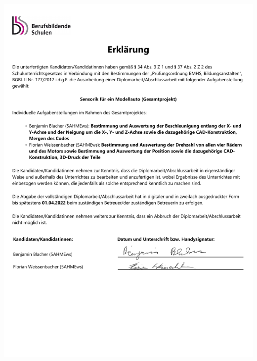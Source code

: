 \documentclass[fontsize=12pt]{article}
\begin{document}
\includegraphics[page=1, scale=0.7]{./sources/DADB.pdf}
\newpage

\newpage

\newpage
\tableofcontents
\newpage

\newpage

\newpage

\newpage

\newpage

\newpage

\newpage

\newpage

\newpage

\newpage
\printbibliography
\newpage

\newpage

\newpage

\end{document}
